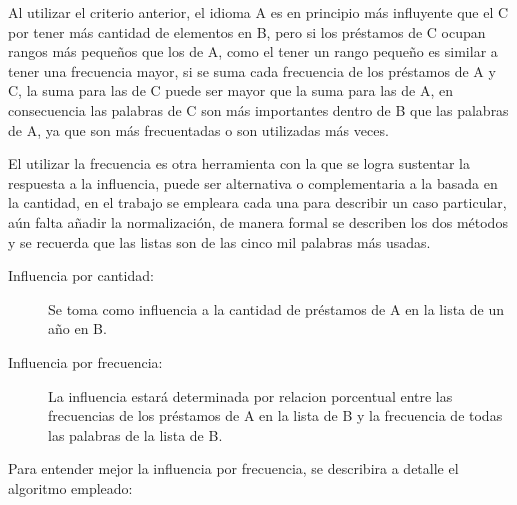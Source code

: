 Al utilizar el criterio anterior,  el idioma A es en principio más influyente que el C por tener más cantidad de elementos en B, pero si los préstamos de C ocupan rangos más pequeños que los de A, como el tener un rango pequeño es similar a tener una frecuencia mayor,  si se suma cada frecuencia  de los préstamos de A y C,  la suma para las de C puede ser mayor que la suma para las de A, en consecuencia las palabras de C son más importantes dentro de B que las palabras de A, ya que son más frecuentadas o son utilizadas más veces.   

El utilizar la frecuencia es otra herramienta con la que se logra sustentar la respuesta a la influencia, puede ser alternativa o complementaria a la basada en la cantidad, en el trabajo se empleara cada una para describir un caso particular, aún falta añadir la normalización,  de manera formal se describen los dos métodos y se recuerda que las listas son de las cinco mil palabras más usadas. 

\begin{description}
	
	\item[Influencia por cantidad:] Se toma como influencia a la cantidad de préstamos de A en la lista de un año en B.
	
	\item[Influencia por frecuencia:] La influencia estará determinada por relacion porcentual entre las frecuencias de los préstamos de A en la lista de B y la frecuencia de todas las palabras de la lista de B. 
	
\end{description}


Para entender mejor  la influencia por frecuencia, se describira a detalle el algoritmo empleado:

